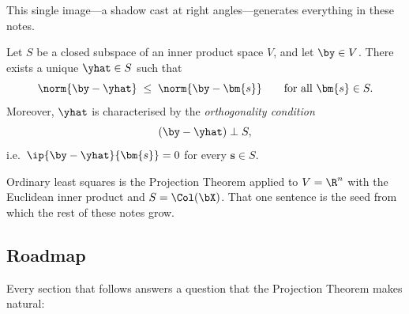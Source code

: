This single image---a shadow cast at right angles---generates everything
in these notes.

\begin{theorem}\label{thm:projection}
Let $S$ be a closed subspace of an inner product space $V$, and let
$\by\in V$. There exists a unique $\yhat\in S$ such that
\[
  \norm{\by - \yhat} \;\le\; \norm{\by - \bm{s}}
  \qquad\text{for all } \bm{s}\in S.
\]
Moreover, $\yhat$ is characterised by the \emph{orthogonality condition}
\[
  (\by - \yhat) \perp S,
\]
i.e.\ $\ip{\by - \yhat}{\bm{s}} = 0$ for every $\bm{s}\in S$.
\end{theorem}

Ordinary least squares is the Projection Theorem applied to
$V = \R^n$ with the Euclidean inner product and $S = \Col(\bX)$.
That one sentence is the seed from which the rest of these notes grow.

\subsection*{Roadmap}

Every section that follows answers a question that the Projection
Theorem makes natural:


